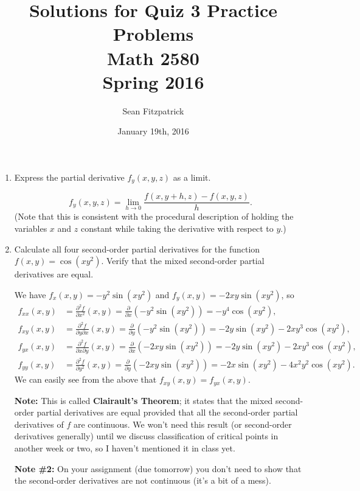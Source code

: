 \documentclass[letterpaper,12pt]{article}
\title{Solutions for Quiz 3 Practice Problems\\Math 2580\\Spring 2016}
\author{Sean Fitzpatrick}
\date{January 19th, 2016}
\begin{document}
 \maketitle

\begin{enumerate}
 \item Express the partial derivative $f_y(x,y,z)$ as a limit.

\[
 f_y(x,y,z) = \lim_{h\to 0}\frac{f(x,y+h,z)-f(x,y,z)}{h}.
\]
(Note that this is consistent with the procedural description of holding the variables $x$ and $z$ constant while taking the derivative with respect to $y$.)

\bigskip

 \item Calculate all four second-order partial derivatives for the function $f(x,y) = \cos(xy^2)$. Verify that the mixed second-order partial derivatives are equal.

\bigskip

We have $f_x(x,y) = -y^2\sin(xy^2)$ and $f_y(x,y) = -2xy\sin(xy^2)$, so
\begin{align*}
 f_{xx}(x,y) &= \frac{\partial^2 f}{\partial x^2}(x,y) = \frac{\partial}{\partial x}(-y^2\sin(xy^2)) = -y^4\cos(xy^2),\\
 f_{xy}(x,y) &= \frac{\partial^2 f}{\partial y\partial x}(x,y) = \frac{\partial}{\partial y}(-y^2\sin(xy^2)) = -2y\sin(xy^2)-2xy^3\cos(xy^2),\\
 f_{yx}(x,y) &= \frac{\partial^2 f}{\partial x\partial y}(x,y) = \frac{\partial}{\partial x}(-2xy\sin(xy^2)) = -2y\sin(xy^2)-2xy^3\cos(xy^2),\\
 f_{yy}(x,y) &= \frac{\partial^2 f}{\partial y^2}(x,y) = \frac{\partial}{\partial y}(-2xy\sin(xy^2)) = -2x\sin(xy^2)-4x^2y^2\cos(xy^2).
\end{align*}
We can easily see from the above that $f_{xy}(x,y)=f_{yx}(x,y)$. 

\medskip

{\bf Note:} This is called {\bf Clairault's Theorem}; it states that the mixed second-order partial derivatives are equal provided that all the second-order partial derivatives of $f$ are continuous. We won't need this result (or second-order derivatives generally) until we discuss classification of critical points in another week or two, so I haven't mentioned it in class yet.

{\bf Note \#2:} On your assignment (due tomorrow) you don't need to show that the second-order derivatives are not continuous (it's a bit of a mess).


\end{enumerate}
\end{document}
